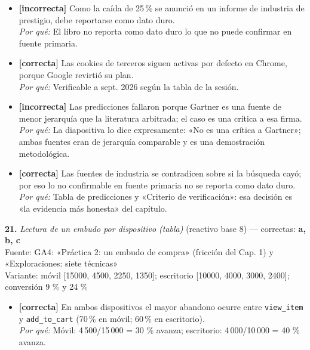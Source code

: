 \documentclass[10pt,letterpaper]{article}
\begin{document}
{\begin{itemize}[leftmargin=1.2em,itemsep=0pt,topsep=1pt,parsep=0pt]
\item[\textbf{a)}] {\footnotesize \textbf{[incorrecta]} Como la caída de 25\,\% se anunció en un informe de industria de prestigio, debe reportarse como dato duro.\\ \textit{Por qué:} El libro no reporta como dato duro lo que no puede confirmar en fuente primaria.}
\item[\textbf{b)}] {\footnotesize \textbf{[correcta]} Las cookies de terceros siguen activas por defecto en Chrome, porque Google revirtió su plan.\\ \textit{Por qué:} Verificable a sept. 2026 según la tabla de la sesión.}
\item[\textbf{c)}] {\footnotesize \textbf{[incorrecta]} Las predicciones fallaron porque Gartner es una fuente de menor jerarquía que la literatura arbitrada; el caso es una crítica a esa firma.\\ \textit{Por qué:} La diapositiva lo dice expresamente: «No es una crítica a Gartner»; ambas fuentes eran de jerarquía comparable y es una demostración metodológica.}
\item[\textbf{d)}] {\footnotesize \textbf{[correcta]} Las fuentes de industria se contradicen sobre si la búsqueda cayó; por eso lo no confirmable en fuente primaria no se reporta como dato duro.\\ \textit{Por qué:} Tabla de predicciones y «Criterio de verificación»: esa decisión es «la evidencia más honesta» del capítulo.}
\end{itemize}
\vspace{3pt}\noindent\textbf{21.} \textit{Lectura de un embudo por dispositivo (tabla)} (reactivo base 8) — correctas: \textbf{a, b, c}\\[-1pt]
{\scriptsize Fuente: GA4: «Práctica 2: un embudo de compra» (fricción del Cap. 1) y «Exploraciones: siete técnicas»}
\\{\scriptsize Variante: móvil [15000, 4500, 2250, 1350]; escritorio [10000, 4000, 3000, 2400]; conversión 9 \% y 24 \%}
\begin{itemize}[leftmargin=1.2em,itemsep=0pt,topsep=1pt,parsep=0pt]
\item[\textbf{a)}] {\footnotesize \textbf{[correcta]} En ambos dispositivos el mayor abandono ocurre entre \texttt{view\_item} y \texttt{add\_to\_cart} (70\,\% en móvil; 60\,\% en escritorio).\\ \textit{Por qué:} Móvil: 4\,500/15\,000 = 30 \% avanza; escritorio: 4\,000/10\,000 = 40 \% avanza.}

\end{itemize}}
\end{document}
